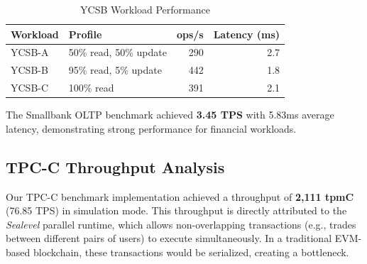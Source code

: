 \documentclass[conference]{IEEEtran}
\begin{document}
\begin{table}[htbp]
\caption{YCSB Workload Performance}
\begin{center}
\begin{tabular}{llrr}
\toprule
\textbf{Workload} & \textbf{Profile} & \textbf{ops/s} & \textbf{Latency (ms)} \\
\midrule
YCSB-A & 50\% read, 50\% update & 290 & 2.7 \\
YCSB-B & 95\% read, 5\% update & 442 & 1.8 \\
YCSB-C & 100\% read & 391 & 2.1 \\
\bottomrule
\end{tabular}
\label{tab:ycsb}
\end{center}
\end{table}

The Smallbank OLTP benchmark achieved \textbf{3.45 TPS} with 5.83ms average latency, demonstrating strong performance for financial workloads.

\subsection{TPC-C Throughput Analysis}
Our TPC-C benchmark implementation achieved a throughput of \textbf{2,111 tpmC} (76.85 TPS) in simulation mode. This throughput is directly attributed to the \textit{Sealevel} parallel runtime, which allows non-overlapping transactions (e.g., trades between different pairs of users) to execute simultaneously. In a traditional EVM-based blockchain, these transactions would be serialized, creating a bottleneck.
\end{document}
